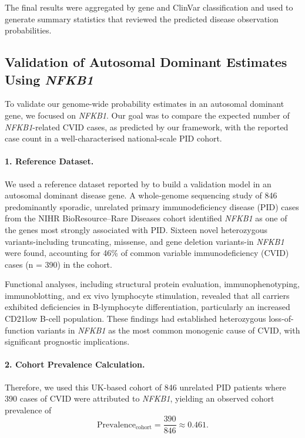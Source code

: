 The final results were aggregated by gene and ClinVar classification and used to generate summary statistics that reviewed the predicted disease observation probabilities.

\subsection{Validation of Autosomal Dominant Estimates Using \textit{NFKB1}}

To validate our genome-wide probability estimates in an autosomal dominant gene, we focused on \textit{NFKB1}. Our goal was to compare the expected number of \textit{NFKB1}-related CVID cases, as predicted by our framework, with the reported case count in a well-characterised national-scale PID cohort.

\paragraph{1. Reference Dataset.}
We used a reference dataset reported by \citet{tuijnenburgNFKB12018} to build a validation model in an autosomal dominant disease gene. 
A whole‐genome sequencing study of 846 predominantly sporadic, unrelated primary immunodeficiency disease (PID) cases from the NIHR BioResource–Rare Diseases cohort  identified \textit{NFKB1} as one of the genes most strongly associated with PID. Sixteen novel heterozygous variants-including truncating, missense, and gene deletion variants-in \textit{NFKB1} were found, accounting for 46\% of common variable immunodeficiency (CVID) cases (n = 390) in the cohort. 

Functional analyses, including structural protein evaluation, immunophenotyping, immunoblotting, and ex vivo lymphocyte stimulation, revealed that all carriers exhibited deficiencies in B-lymphocyte differentiation, particularly an increased CD21low B-cell population. These findings had established heterozygous loss-of-function variants in \textit{NFKB1} as the most common monogenic cause of CVID, with significant prognostic implications.

\paragraph{2. Cohort Prevalence Calculation.}
Therefore, we used this UK-based cohort of 846 unrelated PID patients where 390 cases of CVID were attributed to \textit{NFKB1}, yielding an observed cohort prevalence of
\[
\text{Prevalence}_{\text{cohort}} = \frac{390}{846} \approx 0.461.
\]

